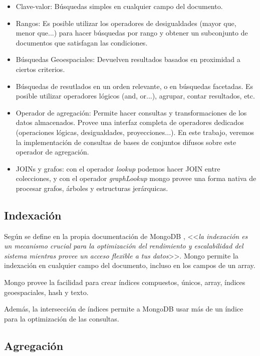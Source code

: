 \begin{itemize}
    \item Clave-valor: Búsquedas simples en cualquier campo del documento.
    \item Rangos: Es posible utilizar los operadores de desigualdades (mayor que, menor que...) para hacer búsquedas por rango y obtener un subconjunto de documentos que satisfagan las condiciones.
    \item Búsquedas Geoespaciales: Devuelven resultados basados en proximidad a ciertos criterios.
    \item Búsquedas de resutlados en un orden relevante, o en búsquedas facetadas. Es posible utilizar operadores lógicos (and, or...), agrupar, contar resultados, etc.
    \item Operador de agregación: Permite hacer consultas y transformaciones de los datos almacenados. Provee una interfaz completa de operadores dedicados (operaciones lógicas, desigualdades, proyecciones...). En este trabajo, veremos la implementación de consultas de bases de conjuntos difusos sobre este operador de agregación.
    \item JOINs y grafos: con el operador \textit{lookup} podemos hacer JOIN entre colecciones, y con el operador \textit{graphLookup} mongo provee una forma nativa de procesar grafos, árboles y estructuras jerárquicas.
\end{itemize}


\subsection{Indexación}

Según se define en la propia documentación de MongoDB \cite{mongodb}, <<\textit{la indexación es un mecanismo crucial para la optimización del rendimiento y escalabilidad del sistema mientras provee un acceso flexible a tus datos}>>. Mongo permite la indexación en cualquier campo del documento, incluso en los campos de un array.

Mongo provee la facilidad para crear índices compuestos, únicos, array, índices geoespaciales, hash y texto.

Además, la intersección de índices permite a MongoDB usar más de un índice para la optimización de las consultas.

\subsection{Agregación}

